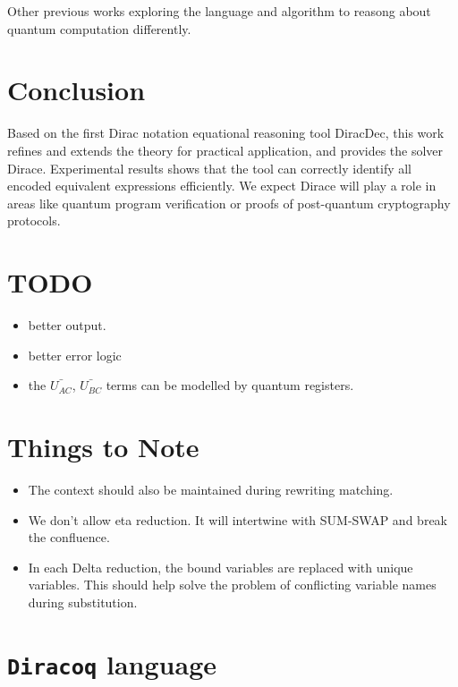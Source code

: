 \documentclass[runningheads]{llncs}
\begin{document}
Other previous works exploring the language and algorithm to reasong about quantum computation differently.




\section{Conclusion}
Based on the first Dirac notation equational reasoning tool DiracDec, this work refines and extends the theory for practical application, and provides the solver Dirace. Experimental results shows that the tool can correctly identify all encoded equivalent expressions efficiently. 
We expect Dirace will play a role in areas like quantum program verification or proofs of post-quantum cryptography protocols.


\clearpage


\section{TODO}
\begin{itemize}
    \item better output.
    \item better error logic
    \item the $\bar{U_{AC}}$, $\bar{U_{BC}}$ terms can be modelled by quantum registers.
\end{itemize}

\section{Things to Note}
\begin{itemize}
    \item The context should also be maintained during rewriting matching.
    \item We don't allow eta reduction. It will intertwine with SUM-SWAP and break the confluence.
    \item In each Delta reduction, the bound variables are replaced with unique variables. This should help solve the problem of conflicting variable names during substitution.
\end{itemize}


\section{\texttt{Diracoq} language}
\end{document}
